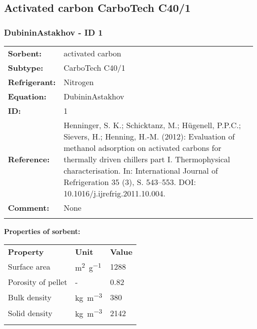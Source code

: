 \subsection{Activated carbon CarboTech C40/1}
%
\subsubsection{DubininAstakhov - ID 1}
%
\begin{tabular}[l]{|lp{11.5cm}|}
\hline
\addlinespace

\textbf{Sorbent:} & activated carbon \\
\textbf{Subtype:} & CarboTech C40/1 \\
\textbf{Refrigerant:} & Nitrogen \\
\textbf{Equation:} & DubininAstakhov \\
\textbf{ID:} & 1 \\
\textbf{Reference:} & Henninger, S. K.; Schicktanz, M.; Hügenell, P.P.C.; Sievers, H.; Henning, H.-M. (2012): Evaluation of methanol adsorption on activated carbons for thermally driven chillers part I. Thermophysical characterisation. In: International Journal of Refrigeration 35 (3), S. 543–553. DOI: 10.1016/j.ijrefrig.2011.10.004. \\
\textbf{Comment:} & None \\

\addlinespace
\hline
\end{tabular}
\newline

\textbf{Properties of sorbent:}
\newline
%
\begin{longtable}[l]{lll}
\toprule
\addlinespace
\textbf{Property} & \textbf{Unit} & \textbf{Value} \\
\addlinespace
\midrule
\endhead
\bottomrule
\endfoot
\bottomrule
\endlastfoot
\addlinespace

Surface area & \si{\square\meter\per\gram} & 1288\\
Porosity of pellet & - & 0.82\\
Bulk density & \si{\kilogram\per\cubic\meter} & 380\\
Solid density & \si{\kilogram\per\cubic\meter} & 2142\\

\addlinespace\end{longtable}

